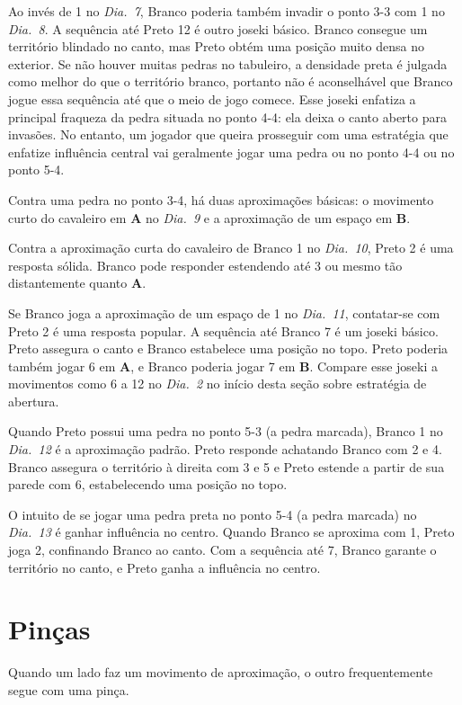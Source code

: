 Ao invés de 1 no \emph{Dia.\@~7}, Branco poderia também invadir o ponto 3-3 com 1 no \emph{Dia.\@~8}. A sequência até Preto 12 é outro joseki básico. Branco consegue um território blindado no canto, mas Preto obtém uma posição muito densa no exterior. Se não houver muitas pedras no tabuleiro, a densidade preta é julgada como melhor do que o território branco, portanto não é aconselhável que Branco jogue essa sequência até que o meio de jogo comece. Esse joseki enfatiza a principal fraqueza da pedra situada no ponto 4-4: ela deixa o canto aberto para invasões. No entanto, um jogador que queira prosseguir com uma estratégia que enfatize influência central vai geralmente jogar uma pedra ou no ponto 4-4 ou no ponto 5-4.

Contra uma pedra no ponto 3-4, há duas aproximações básicas: o movimento curto do cavaleiro em \textbf{A} no \emph{Dia.\@~9} e a aproximação de um espaço em \textbf{B}.

Contra a aproximação curta do cavaleiro de Branco 1 no \emph{Dia.\@~10}, Preto 2 é uma resposta sólida. Branco pode responder estendendo até 3 ou mesmo tão distantemente quanto \textbf{A}.

Se Branco joga a aproximação de um espaço de 1 no \emph{Dia.\@~11}, contatar-se com Preto 2 é uma resposta popular. A sequência até Branco 7 é um joseki básico. Preto assegura o canto e Branco estabelece uma posição no topo. Preto poderia também jogar 6 em \textbf{A}, e Branco poderia jogar 7 em \textbf{B}. Compare esse joseki a movimentos como 6 a 12 no \emph{Dia.\@~2} no início desta seção sobre estratégia de abertura.

Quando Preto possui uma pedra no ponto 5-3 (a pedra marcada), Branco 1 no \emph{Dia.\@~12} é a aproximação padrão. Preto responde achatando Branco com 2 e 4. Branco assegura o território à direita com 3 e 5 e Preto estende a partir de sua parede com 6, estabelecendo uma posição no topo.

O intuito de se jogar uma pedra preta no ponto 5-4 (a pedra marcada) no \emph{Dia.\@~13} é ganhar influência no centro. Quando Branco se aproxima com 1, Preto joga 2, confinando Branco ao canto. Com a sequência até 7, Branco garante o território no canto, e Preto ganha a influência no centro.

\section{Pinças}

Quando um lado faz um movimento de aproximação, o outro frequentemente segue com uma pinça.

